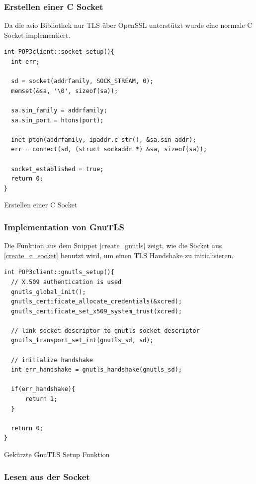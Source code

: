 \documentclass[12pt, letterpaper]{article}
\newenvironment{code}{\captionsetup{type=listing}}{}
\begin{document}
\newpage

\subsubsection{Erstellen einer C Socket}

Da die asio Bibliothek nur TLS über OpenSSL unterstützt wurde eine normale C Socket implementiert. 

\begin{code}
\begin{verbatim}
int POP3client::socket_setup(){
  int err;

  sd = socket(addrfamily, SOCK_STREAM, 0);
  memset(&sa, '\0', sizeof(sa));

  sa.sin_family = addrfamily;
  sa.sin_port = htons(port);

  inet_pton(addrfamily, ipaddr.c_str(), &sa.sin_addr);
  err = connect(sd, (struct sockaddr *) &sa, sizeof(sa));

  socket_established = true;
  return 0;
}
\end{verbatim}
\caption{Erstellen einer C Socket}
\label{create_c_socket}
\end{code}

\subsubsection{Implementation von GnuTLS}
\label{gnutls_implement_proj}
Die Funktion aus dem Snippet \ref{create_gnutls} zeigt, wie die Socket aus \ref{create_c_socket} benutzt wird, um einen TLS Handshake zu initialisieren.

\begin{code}
\begin{verbatim}
int POP3client::gnutls_setup(){
  // X.509 authentication is used
  gnutls_global_init();
  gnutls_certificate_allocate_credentials(&xcred);
  gnutls_certificate_set_x509_system_trust(xcred);

  // link socket descriptor to gnutls socket descriptor
  gnutls_transport_set_int(gnutls_sd, sd);

  // initialize handshake
  int err_handshake = gnutls_handshake(gnutls_sd);

  if(err_handshake){
      return 1;
  }

  return 0;
}
\end{verbatim}
\caption{Gekürzte GnuTLS Setup Funktion}
\label{create_gnutls}
\end{code}

\subsubsection{Lesen aus der Socket}
\end{document}
